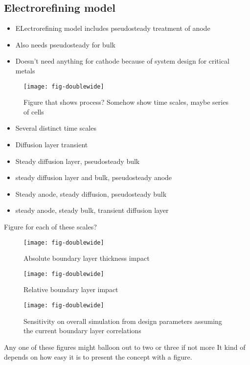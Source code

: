 \documentclass[journal=mamobx]{achemso}
\begin{document}
\subsection{Electrorefining model}
\begin{itemize}
  \item ELectrorefining model includes pseudosteady treatment of anode
  \item Also needs pseudosteady for bulk
  \item Doesn't need anything for cathode because of system design for critical metals
\end{itemize}
\begin{figure*}[tbp]
  \texttt{[image: fig-doublewide]}
  \caption{Figure that shows process? Somehow show time scales, maybe series of cells}
  \label{fig-doublewide}
\end{figure*}
\begin{itemize}
  \item Several distinct time scales
  \item Diffusion layer transient
  \item Steady diffusion layer, pseudosteady bulk
  \item steady diffusion layer and bulk, pseudosteady anode
  \item Steady anode, steady diffusion, pseudosteady bulk
  \item steady anode, steady bulk, transient diffusion layer
\end{itemize}
Figure for each of these scales?

\begin{figure*}[tbp]
  \texttt{[image: fig-doublewide]}
  \caption{Absolute boundary layer thickness impact}
  \label{fig-doublewide}
\end{figure*}
\begin{figure*}[tbp]
  \texttt{[image: fig-doublewide]}
  \caption{Relative boundary layer impact}
  \label{fig-doublewide}
\end{figure*}
\begin{figure*}[tbp]
  \texttt{[image: fig-doublewide]}
  \caption{Sensitivity on overall simulation from design parameters assuming the current boundary layer correlations}
  \label{fig-doublewide}
\end{figure*}

Any one of these figures might balloon out to two or three if not more
It kind of depends on how easy it is to present the concept with a figure.
\end{document}
